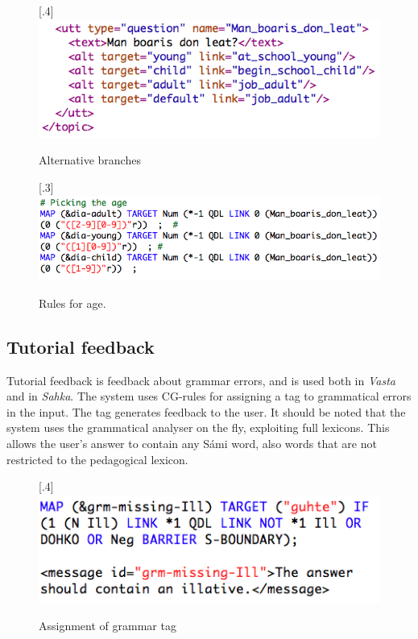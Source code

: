 \documentclass[11pt]{article}
\begin{document}
\begin{figure}%
\begin{center}
\scalebox{.4}[.4]{\includegraphics{presentation/img/age_branching.png}}\\
\caption{Alternative branches}
\label{agebranches}
\end{center}
\end{figure}

\begin{figure}%
\begin{center}
\scalebox{.3}[.3]{\includegraphics{presentation/img/pickingage_colours.png}}\\
\caption{Rules for age.}
\label{agerule}
\end{center}
\end{figure}

\newpage

\subsection{Tutorial feedback}
Tutorial feedback is feedback about grammar errors, and is used both in \textit{Vasta} and in \textit{Sahka}. The system uses CG-rules for assigning a tag to grammatical errors in the input. The tag generates feedback to the user. It should be noted that the system uses the grammatical analyser on the fly, exploiting full lexicons. This allows the user's answer to contain any Sámi word, also words that are not restricted to the pedagogical lexicon.

\begin{figure}%
\begin{center}
\scalebox{.4}[.4]{\includegraphics{presentation/img/missingIll.png}}\\
\caption{Assignment of grammar tag}
\end{center}
\end{figure}
\end{document}
